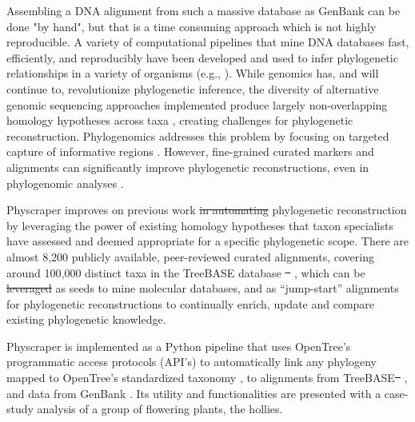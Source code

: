 \documentclass{bmcart}
\providecommand{\DIFaddtex}[1]{{\protect\color{blue}\uwave{#1}}} %
\providecommand{\DIFdeltex}[1]{{\protect\color{red}\sout{#1}}}                      %
\providecommand{\DIFaddbegin}{} %
\providecommand{\DIFaddend}{} %
\providecommand{\DIFdelbegin}{} %
\providecommand{\DIFdelend}{} %
\providecommand{\DIFadd}[1]{\texorpdfstring{\DIFaddtex{#1}}{#1}} %
\providecommand{\DIFdel}[1]{\texorpdfstring{\DIFdeltex{#1}}{}} %
\begin{document}
Assembling a DNA alignment from such a massive database as GenBank can be done "by hand",
but that is a time consuming approach which is not highly reproducible.
A variety of computational pipelines that mine DNA databases fast, efficiently, and reproducibly
have been developed and used to infer phylogenetic relationships in a variety of organisms
(e.g., \cite{smith2009mega, antonelli2017toward, izquierdo2014pumper, pearse2013phylogenerator}).
While genomics has, and will continue to, revolutionize phylogenetic inference,
the diversity of alternative genomic sequencing approaches implemented produce
largely non-overlapping homology hypotheses across taxa \cite{jones2016targeted},
creating challenges for phylogenetic reconstruction.
Phylogenomics addresses this problem by focusing on targeted capture of informative
regions \cite{andermann2020guide}.
However, fine-grained curated markers and alignments can significantly improve phylogenetic
reconstructions, even in phylogenomic analyses \cite{fragoso2017pilot}.

Physcraper improves on previous work \DIFdelbegin \DIFdel{in automating }\DIFdelend \DIFaddbegin \DIFadd{to automate }\DIFaddend phylogenetic reconstruction by leveraging
the power of existing homology hypotheses that \DIFaddbegin \DIFadd{phylogeneticists and }\DIFaddend taxon specialists have assessed
and deemed appropriate for a specific phylogenetic scope.
There are almost 8,200 publicly available, peer-reviewed curated alignments, covering
around 100,000 distinct taxa in the TreeBASE database
\DIFdelbegin \DIFdel{\mbox{%
\cite{piel2009treebase}}\hspace{0pt}%
}\DIFdelend \DIFaddbegin \DIFadd{\mbox{%
\cite{piel2009treebase, vos2012nexml, piel2018treebasedmp, treebase_website, supertreebase}}\hspace{0pt}%
}\DIFaddend ,
which can be \DIFdelbegin \DIFdel{leveraged }\DIFdelend \DIFaddbegin \DIFadd{used }\DIFaddend as seeds to mine molecular databases, and as ``jump-start'' alignments
for phylogenetic reconstructions \cite{morrison2006multiple} to continually enrich,
update and compare existing phylogenetic knowledge.

Physcraper is implemented as a Python pipeline that uses OpenTree's programmatic access
protocols (API's) to automatically
link any phylogeny mapped to OpenTree's standardized taxonomy \cite{mctavish2015phylesystem},
to alignments
from TreeBASE\DIFdelbegin \DIFdel{\mbox{%
\cite{sanderson1994treebase}}\hspace{0pt}%
}\DIFdelend , and data from GenBank \cite{benson2000genbank}.
Its utility and functionalities are presented with a case-study analysis of a
group of flowering plants, the hollies.
\end{document}
